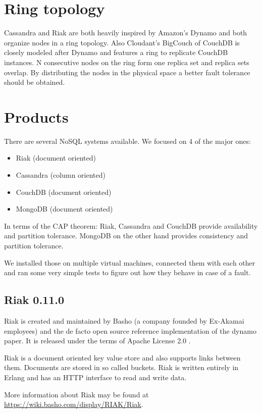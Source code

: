 \section{Ring topology}

Cassandra and Riak are both heavily inspired by Amazon's Dynamo and
both organize nodes in a ring topology. Also Cloudant's BigCouch
\cite{bigcouch}  of CouchDB is closely modeled after Dynamo
and features a ring to replicate CouchDB instances. N consecutive
nodes on the ring form one replica set and replica sets overlap. By
distributing the nodes in the physical space a better fault
tolerance should be obtained.

\section{Products}

There are several NoSQL systems available. We focused on 4 of the
major ones:

\begin{itemize}
\item
  Riak (document oriented)
\item
  Cassandra (column oriented)
\item
  CouchDB (document oriented)
\item
  MongoDB (document oriented)
\end{itemize}
In terms of the CAP theorem: Riak, Cassandra and CouchDB provide
availability and partition tolerance. MongoDB on the other hand
provides consistency and partition tolerance.

We installed those on multiple virtual machines, connected them
with each other and ran some very simple tests to figure out how
they behave in case of a fault.

\subsection{Riak 0.11.0}

Riak is created and maintained by Basho (a company founded by
Ex-Akamai employees) and the de facto open source reference
implementation of the dynamo paper. It is released under the terms
of Apache License 2.0 .

Riak is a document oriented key value store and also supports links
between them. Documents are stored in so called buckets. Riak is
written entirely in Erlang and has an HTTP interface to read and
write data.

More information about Riak may be found at
\url{https://wiki.basho.com/display/RIAK/Riak}.

